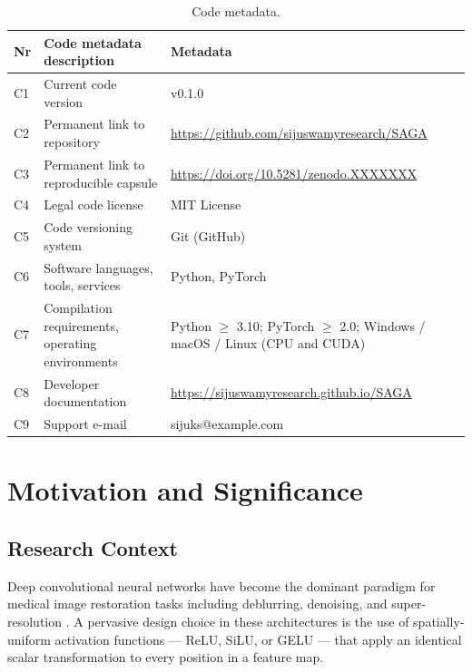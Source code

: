 \documentclass[preprint,12pt]{elsarticle}
\begin{document}
\noindent
\begin{table}[h!]
\caption{Code metadata.}
\label{tab:metadata}
\begin{tabular}{llp{7.5cm}}
\toprule
\textbf{Nr} & \textbf{Code metadata description} & \textbf{Metadata} \\
\midrule
C1 & Current code version & v0.1.0 \\
C2 & Permanent link to repository
   & \url{https://github.com/sijuswamyresearch/SAGA} \\
C3 & Permanent link to reproducible capsule
   & \url{https://doi.org/10.5281/zenodo.XXXXXXX} \\
C4 & Legal code license & MIT License \\
C5 & Code versioning system & Git (GitHub) \\
C6 & Software languages, tools, services & Python, PyTorch \\
C7 & Compilation requirements, operating environments
   & Python $\geq$ 3.10; PyTorch $\geq$ 2.0;
     Windows / macOS / Linux (CPU and CUDA) \\
C8 & Developer documentation
   & \url{https://sijuswamyresearch.github.io/SAGA} \\
C9 & Support e-mail & sijuks@example.com \\
\bottomrule
\end{tabular}
\end{table}

\section{Motivation and Significance}
\label{sec:motivation}

\subsection{Research Context}

Deep convolutional neural networks have become the dominant paradigm for
medical image restoration tasks including deblurring, denoising, and
super-resolution \cite{chen2021pre,ronneberger2015unet}.
A pervasive design choice in these architectures is the use of
spatially-uniform activation functions — ReLU, SiLU, or GELU — that apply
an identical scalar transformation to every position in a feature map.
\end{document}
